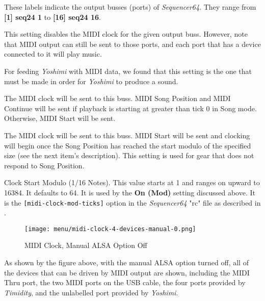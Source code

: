    \setcounter{ItemCounter}{0}      %

   These labels indicate the output busses (ports) of \textsl{Sequencer64}.
   They range from \textbf{[1] seq24 1} to \textbf{[16] seq24 16}.

   This setting disables the MIDI clock for the given output buss.
   However, note that MIDI output can still be sent to those ports, and
   each port that has a device connected to it will play music.
   
   For feeding \textsl{Yoshimi} with MIDI data, we found that this
   setting is the one that must be made in order for \textsl{Yoshimi} to
   produce a sound.

   The MIDI clock will be sent to this buss.
   MIDI Song Position and MIDI Continue will be sent if playback is starting
   at greater than tick 0 in Song mode.  Otherwise, MIDI Start will be sent.

   The MIDI clock will be sent to this buss.
   MIDI Start will be sent and clocking will begin
   once the Song Position has reached the start modulo of the specified size
   (see the next item's description).
   This setting is used for gear that does not respond to Song Position.

   Clock Start Modulo (1/16 Notes).
   This value starts at 1 and ranges on upward to 16384.
   It  defaults to 64.
   It is used by the \textbf{On (Mod)} setting discussed above.
   It is the \texttt{[midi-clock-mod-ticks]} option in the \textsl{Sequencer64}
   "rc" file as described in
   .

\begin{figure}[H]
   \centering 
   \texttt{[image: menu/midi-clock-4-devices-manual-0.png]}
   \caption{MIDI Clock, Manual ALSA Option Off}
   \label{fig:seq64_midi_clock_4_devices_manual_0}
\end{figure}

   As shown by the figure above, with the manual ALSA option turned off,
   all of the devices that can be driven by MIDI output are shown,
   including the MIDI Thru port, the two MIDI ports on the USB cable,
   the four ports provided by \textsl{Timidity}, and the unlabelled
   port provided by \textsl{Yoshimi}.

